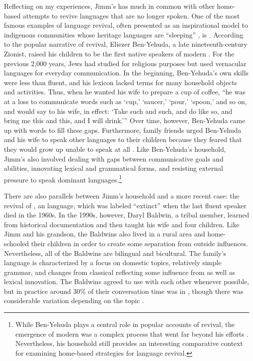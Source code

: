 \documentclass[output=paper]{LSP/langsci}
\begin{document}
Reflecting on my experiences, Jimm's  has much in common with other home-based attempts to revive languages that are no longer spoken. One of the most famous examples of language revival, often presented as an inspirational model to indigenous communities whose heritage languages are ``sleeping'' \citep[see][]{Hinton2008}, is . According to the popular narrative of  revival, Eliezer Ben-Yehuda, a late nineteenth-century Zionist, raised his children to be the first native speakers of modern . For the previous 2,000 years, Jews had studied  for religious purposes but used vernacular languages for everyday communication. In the beginning, Ben-Yehuda's own  skills were less than fluent, and his lexicon lacked terms for many household objects and activities. Thus, when he wanted his wife to prepare a cup of coffee, ``he was at a loss to communicate words such as `cup,' `saucer,' `pour,' `spoon,' and so on, and would say to his wife, in effect: `Take such and such, and do like so, and bring me this and this, and I will drink.'\thinspace'' \citep[37--38]{Fellman1973} Over time, however, Ben-Yehuda came up with words to fill these gaps. Furthermore, family friends urged Ben-Yehuda and his wife to speak other languages to their children because they feared that they would grow up unable to speak at all \citep[50--53]{BenAvi1984}. Like Ben-Yehuda's household, Jimm's  also involved dealing with gaps between communicative goals and abilities, innovating lexical and grammatical forms, and resisting external pressure to speak dominant languages.\footnote{While Ben-Yehuda plays a central role in popular accounts of  revival, the emergence of modern  was a complex process that went far beyond his efforts \citep{Harshav1999}. Nevertheless, his household still provides an interesting comparative context for examining home-based strategies for language revival.}

There are also parallels between Jimm's household and a more recent case: the revival of , an  language, which was labeled ``extinct'' when the last fluent speaker died in the 1960s. In the 1990s, however, Daryl Baldwin, a tribal member, learned  from historical documentation and then taught his wife and four children. Like Jimm and his grandson, the Baldwins also lived in a rural area and home-schooled their children in order to create some separation from outside influences. Nevertheless, all of the Baldwins are bilingual and bicultural. The family's language is characterized by a focus on domestic topics, relatively simple grammar, and changes from classical  reflecting some influence from  as well as lexical innovation. The Baldwins agreed to use  with each other whenever possible, but in practice around 30\% of their conversation time was in , though there was considerable variation depending on the topic \citep[14]{Leonard2007}.
\end{document}
